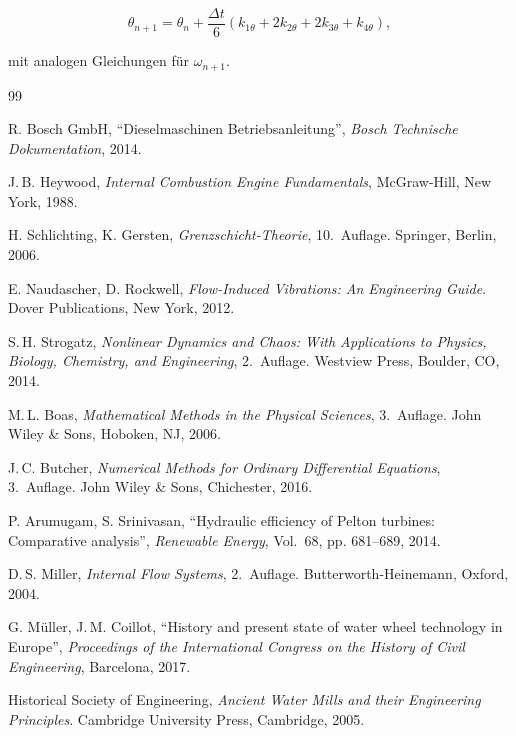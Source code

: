 \documentclass[a4paper,12pt]{article}
\theoremstyle{definition}
\begin{document}
\begin{equation}
  \theta_{n+1} = \theta_n + \frac{\Delta t}{6}(k_{1\theta} + 2k_{2\theta} + 2k_{3\theta} + k_{4\theta}),
  \label{eq:rk4_theta}
\end{equation}

\noindent
mit analogen Gleichungen für $\omega_{n+1}$.


\begin{thebibliography}{99}

R. Bosch GmbH,
``Dieselmaschinen Betriebsanleitung'',
\textit{Bosch Technische Dokumentation}, 2014.

J.\,B. Heywood,
\textit{Internal Combustion Engine Fundamentals},
McGraw-Hill, New York, 1988.

H. Schlichting, K. Gersten,
\textit{Grenzschicht-Theorie}, 10.~Auflage.
Springer, Berlin, 2006.

E. Naudascher, D. Rockwell,
\textit{Flow-Induced Vibrations: An Engineering Guide}.
Dover Publications, New York, 2012.

S.\,H. Strogatz,
\textit{Nonlinear Dynamics and Chaos: With Applications to Physics, Biology, Chemistry, and Engineering}, 2.~Auflage.
Westview Press, Boulder, CO, 2014.

M.\,L. Boas,
\textit{Mathematical Methods in the Physical Sciences}, 3.~Auflage.
John Wiley \& Sons, Hoboken, NJ, 2006.

J.\,C. Butcher,
\textit{Numerical Methods for Ordinary Differential Equations}, 3.~Auflage.
John Wiley \& Sons, Chichester, 2016.

P. Arumugam, S. Srinivasan,
``Hydraulic efficiency of Pelton turbines: Comparative analysis'',
\textit{Renewable Energy}, Vol.~68, pp. 681--689, 2014.

D.\,S. Miller,
\textit{Internal Flow Systems}, 2.~Auflage.
Butterworth-Heinemann, Oxford, 2004.

G. Müller, J.\,M. Coillot,
``History and present state of water wheel technology in Europe'',
\textit{Proceedings of the International Congress on the History of Civil Engineering}, Barcelona, 2017.

Historical Society of Engineering,
\textit{Ancient Water Mills and their Engineering Principles}.
Cambridge University Press, Cambridge, 2005.

\end{thebibliography}
\end{document}
